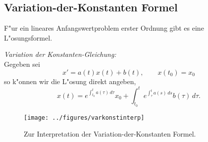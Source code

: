 \begin{auf}\cha\label{block2A1}

\end{auf}
\subsection{Variation-der-Konstanten Formel}

F"ur ein lineares Anfangswertproblem erster Ordnung gibt es eine L"osungsformel. 

\begin{ssatz}
{\it Variation der Konstanten-Gleichung:}\\
Gegeben sei 
$$ x' = a(t) x(t) + b(t), \qquad x(t_0) = x_0$$
so k"onnen wir die L"osung direkt angeben,
$$ x(t) = e^{\int_{t_0}^t a(\tau)\, d\tau} x_0 + \int_{t_0}^t e^{\int_\tau^t a(s)\, ds} b(\tau)\, d\tau.$$
\end{ssatz}

\begin{figure}[t]
  \begin{center}
   \texttt{[image: ../figures/varkonstinterp]}
  \end{center}
\vspace*{-1cm}
  \caption{Zur Interpretation der Variation-der-Konstanten Formel.}
\label{varkonstint}
\end{figure}


